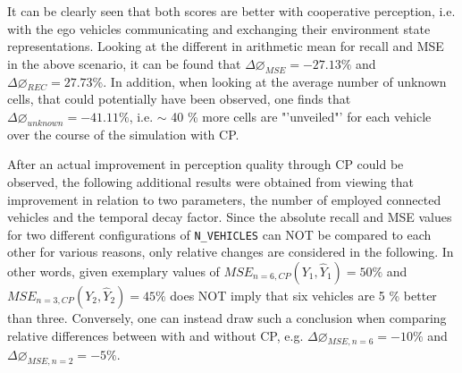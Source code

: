 It can be clearly seen that both scores are better with cooperative perception, i.e. with the ego vehicles communicating and exchanging their environment state representations. Looking at the different in arithmetic mean for recall and MSE in the above scenario, it can be found that $\Delta \diameter_{MSE} = -27.13 \%$ and $\Delta \diameter_{REC} = 27.73 \%$. In addition, when looking at the average number of unknown cells, that could potentially have been observed, one finds that $\Delta \diameter_{unknown} = -41.11 \%$, i.e. $\sim$ 40 \% more cells are "'unveiled"' for each vehicle over the course of the simulation with CP.
\par
\bigskip

After an actual improvement in perception quality through CP could be observed, the following additional results were obtained from viewing that improvement in relation to two parameters, the number of employed connected vehicles and the temporal decay factor. Since the absolute recall and MSE values for two different configurations of \texttt{N\_VEHICLES} can NOT be compared to each other for various reasons, only relative changes are considered in the following. In other words, given exemplary values of $\textit{MSE}_{n=6, CP}(Y_1, \hat{Y}_1) = 50 \%$ and $\textit{MSE}_{n=3, CP}(Y_2, \hat{Y}_2) = 45 \%$ does NOT imply that six vehicles are 5 \% better than three. Conversely, one can instead draw such a conclusion when comparing relative differences between with and without CP, e.g. $\Delta \diameter_{MSE,n=6} = -10 \%$ and $\Delta \diameter_{MSE,n=2} = -5 \%$.

